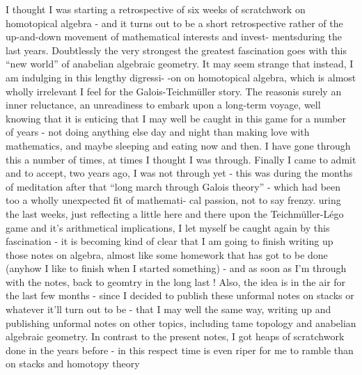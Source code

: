 
I thought I was starting a retrospective of six weeks of scratchwork
on homotopical algebra  -  and it turns out to be a  short retrospective
rather of the up-and-down movement of  mathematical interests and invest-%
ments\hand{|}during the last years.  Doubtlessly the very strongest\unsure{\hand{,}}  the greatest
fascination goes with this ``new world'' of anabelian algebraic geometry.
It may seem strange that instead,  I am indulging in this lengthy digressi-%
-on on homotopical algebra,  which is almost wholly irrelevant I feel for
the Galois-Teichmüller story.  The reason\hand{|}is surely an inner reluctance,
an unreadiness to embark upon a long-term voyage,  well knowing that it is
 enticing that I may well be caught in this game for a number of
years - not doing anything else  day and night than making love with
mathematics,  and maybe sleeping and eating now and then.  I have gone
through this a number of times,  at times I thought I was through.  Finally
I came to admit and to accept,  two years ago,  I was not through yet -
this was during the months of meditation after that ``long march through
Galois theory'' -  which had been\hand{,} too\hand{,} a wholly unexpected fit of mathemati-%
cal passion, not to say frenzy.   uring the last weeks,  just
reflecting a little here and there upon the Teichmüller-Légo game and
it's arithmetical implications,  I let myself be caught again by this
fascination  - it is becoming kind of clear  that I am going to finish
writing up those notes on algebra,  almost like some homework that has got
to be done (anyhow I like to finish when I started  something)  -  and
as soon as I'm through with the notes,  back to geomtry in the long last !
Also,  the idea is in the air for the last few months  -  since I decided
to publish these unformal notes on stacks or whatever it'll turn out to be -
that I may well  the same way,  writing up and publishing unformal notes
on other topics,  including tame topology and anabelian algebraic geometry.
In contrast to the present notes,  I got heaps of scratchwork done  in the
years before  -  in this respect time is even riper for me to ramble  
 than on stacks and homotopy theory

